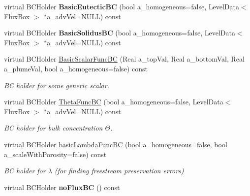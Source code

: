 \begin{DoxyCompactItemize}
\item 
\hypertarget{class_phys_b_c_util_a4521d04f7b741128bfe22ecf7a619ae7}{virtual B\-C\-Holder {\bfseries Basic\-Eutectic\-B\-C} (bool a\-\_\-homogeneous=false, Level\-Data$<$ Flux\-Box $>$ $\ast$a\-\_\-adv\-Vel=N\-U\-L\-L) const }\label{class_phys_b_c_util_a4521d04f7b741128bfe22ecf7a619ae7}

\item 
\hypertarget{class_phys_b_c_util_a740da087df9ecb41abf9cab67a58a066}{virtual B\-C\-Holder {\bfseries Basic\-Solidus\-B\-C} (bool a\-\_\-homogeneous=false, Level\-Data$<$ Flux\-Box $>$ $\ast$a\-\_\-adv\-Vel=N\-U\-L\-L) const }\label{class_phys_b_c_util_a740da087df9ecb41abf9cab67a58a066}

\item 
\hypertarget{class_phys_b_c_util_acc28f597e867ec180867c8b6a4ebb07f}{virtual B\-C\-Holder \hyperlink{class_phys_b_c_util_acc28f597e867ec180867c8b6a4ebb07f}{Basic\-Scalar\-Func\-B\-C} (Real a\-\_\-top\-Val, Real a\-\_\-bottom\-Val, Real a\-\_\-plume\-Val, bool a\-\_\-homogeneous=false) const }\label{class_phys_b_c_util_acc28f597e867ec180867c8b6a4ebb07f}

\begin{DoxyCompactList}\small\item\em B\-C holder for some generic scalar. \end{DoxyCompactList}\item 
\hypertarget{class_phys_b_c_util_af438215be0fa9dc036688e366ac3838d}{virtual B\-C\-Holder \hyperlink{class_phys_b_c_util_af438215be0fa9dc036688e366ac3838d}{Theta\-Func\-B\-C} (bool a\-\_\-homogeneous=false, Level\-Data$<$ Flux\-Box $>$ $\ast$a\-\_\-adv\-Vel=N\-U\-L\-L) const }\label{class_phys_b_c_util_af438215be0fa9dc036688e366ac3838d}

\begin{DoxyCompactList}\small\item\em B\-C holder for bulk concentration $ \Theta $. \end{DoxyCompactList}\item 
\hypertarget{class_phys_b_c_util_a6410e91f537da1e28cc82c53c7cbdde4}{virtual B\-C\-Holder \hyperlink{class_phys_b_c_util_a6410e91f537da1e28cc82c53c7cbdde4}{basic\-Lambda\-Func\-B\-C} (bool a\-\_\-homogeneous=false, bool a\-\_\-scale\-With\-Porosity=false) const }\label{class_phys_b_c_util_a6410e91f537da1e28cc82c53c7cbdde4}

\begin{DoxyCompactList}\small\item\em B\-C holder for $ \lambda $ (for finding freestream preservation errors) \end{DoxyCompactList}\item 
\hypertarget{class_phys_b_c_util_a5959fe1d9dfdb154fea3b6c1f6fba434}{virtual B\-C\-Holder {\bfseries no\-Flux\-B\-C} () const }\label{class_phys_b_c_util_a5959fe1d9dfdb154fea3b6c1f6fba434}


\end{DoxyCompactItemize}
